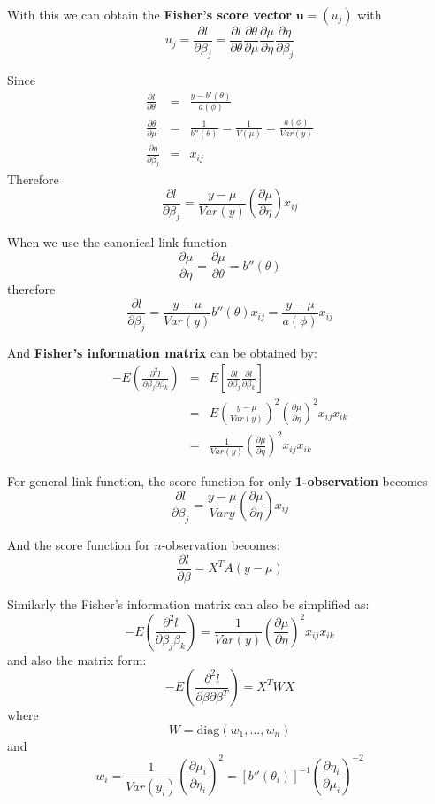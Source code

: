 \documentclass[11pt,addpoints]{exam}
\begin{document}
\begin{CJK*}{UTF8}{gbsn}
With this we can obtain the \textbf{Fisher's score vector} $\mathbf{u} = (u_j)$ with
$$
u_j = \frac{\partial l}{\partial \beta_j} = \frac{\partial l}{\partial \theta} \frac{\partial \theta}{\partial \mu} \frac{\partial \mu}{\partial \eta} \frac{\partial \eta}{\partial \beta_j}
$$

Since
$$
\begin{array}{lcl}
\frac{\partial l}{\partial \theta} &=& \frac{y - b'(\theta)}{a(\phi)}\\
\frac{\partial \theta}{\partial \mu} &=& \frac{1}{b''(\theta)} = \frac{1}{V(\mu)} = \frac{a(\phi)}{Var(y)}\\
\frac{\partial \eta}{\partial \beta_j} &=& x_{ij}
\end{array}
$$
Therefore
$$
\frac{\partial l}{\partial \beta_j} = \frac{y-\mu}{Var(y)} \left( \frac{\partial \mu}{\partial \eta} \right)x_{ij}
$$

When we use the canonical link function
$$
\frac{\partial \mu}{\partial \eta} = \frac{\partial \mu}{\partial \theta} = b''(\theta)
$$
therefore
$$
\frac{\partial l}{\partial \beta_j} = \frac{y-\mu}{Var(y)}b''(\theta)x_{ij} = \frac{y-\mu}{a(\phi)} x_{ij}
$$


And \textbf{Fisher's information matrix} can be obtained by:
$$
\begin{array}{lcl}
-E\left( \frac{\partial^2 l}{\partial \beta_j \partial \beta_k} \right) &=& E\left[ \frac{\partial l}{\partial \beta_j} \frac{\partial l}{\partial \beta_k}\right]\\
&=& E\left( \frac{y-\mu}{Var(y)}\right)^2 \left( \frac{\partial \mu}{\partial \eta}\right)^2 x_{ij} x_{ik}\\
&=& \frac{1}{Var(y)} \left( \frac{\partial \mu}{\partial \eta} \right)^2 x_{ij} x_{ik}
\end{array}
$$

For general link function, the score function for only \textbf{1-observation} becomes
$$
\frac{\partial l}{\partial \beta_j} = \frac{y-\mu}{Var{y}} \left( \frac{\partial \mu}{\partial \eta}\right) x_{ij}
$$

And the score function for $n$-observation becomes:
$$
\frac{\partial l}{\partial \beta} = X^T A(y-\mu)
$$

Similarly the Fisher's information matrix can also be simplified as:
$$
-E\left( \frac{\partial^2 l}{\partial \beta_j \beta_k} \right) = \frac{1}{Var(y)} \left( \frac{\partial \mu}{\partial \eta}\right)^2 x_{ij} x_{ik}
$$
and also the matrix form:
$$
-E\left( \frac{\partial^2 l}{\partial \beta \partial \beta^T} \right) = X^T W X
$$
where
$$
W = \text{diag}(w_1, \dots, w_n)
$$
and 
$$
w_i = \frac{1}{Var(y_i)} \left( \frac{\partial \mu_i}{\partial \eta_i}\right)^2 = [b''(\theta_i)]^{-1} \left( \frac{\partial \eta_i}{\partial \mu_i}\right)^{-2}
$$




\end{CJK*}
\end{document}
